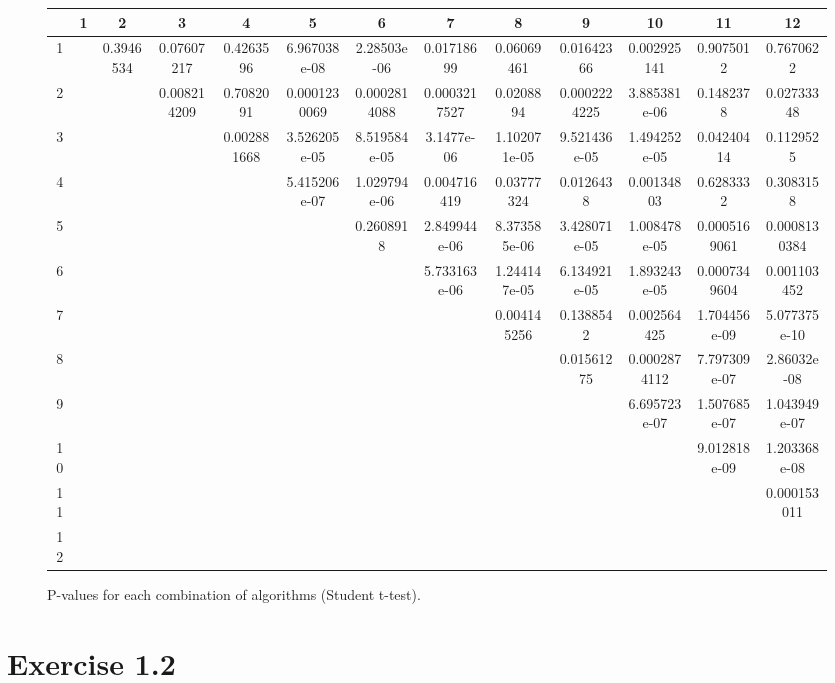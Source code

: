 \begin{landscape}
\begin{figure}
\begin{center}
	\begin{tabular}{|c|c|c|c|c|c|c|c|c|c|c|c|c|} \hline
		& 1 & 2 & 3 & 4 & 5 & 6 & 7 & 8 & 9 & 10 & 11 & 12 \\ \hline \hline
		1 & & 0.3946534 & 0.07607217 & 0.4263596 & 6.967038e-08 & 2.28503e-06 & 0.01718699 & 0.06069461 & 0.01642366 & 0.002925141 & 0.9075012 & 0.7670622 \\ \hline
		2 & & & 0.008214209 & 0.7082091 & 0.0001230069 & 0.0002814088 & 0.0003217527 & 0.0208894 & 0.0002224225 & 3.885381e-06 & 0.1482378 & 0.02733348 \\ \hline
		3 & & & & 0.002881668 & 3.526205e-05 & 8.519584e-05 & 3.1477e-06 & 1.102071e-05 & 9.521436e-05 & 1.494252e-05 & 0.04240414 & 0.1129525 \\ \hline
		4 & & & & & 5.415206e-07 & 1.029794e-06 & 0.004716419 & 0.03777324 & 0.0126438 & 0.00134803 & 0.6283332 & 0.3083158 \\ \hline
		5 & & & & & & 0.2608918 & 2.849944e-06 & 8.373585e-06 & 3.428071e-05 & 1.008478e-05 & 0.0005169061 & 0.0008130384 \\ \hline
		6 & & & & & & & 5.733163e-06 & 1.244147e-05 & 6.134921e-05 & 1.893243e-05 & 0.0007349604 & 0.001103452 \\ \hline
		7 & & & & & & & & 0.004145256 & 0.1388542 & 0.002564425 & 1.704456e-09 & 5.077375e-10 \\ \hline
		8 & & & & & & & & & 0.01561275 & 0.0002874112 & 7.797309e-07 & 2.86032e-08 \\ \hline
		9 & & & & & & & & & & 6.695723e-07 & 1.507685e-07 & 1.043949e-07 \\ \hline
		10 & & & & & & & & & & & 9.012818e-09 & 1.203368e-08 \\ \hline
		11 & & & & & & & & & & & & 0.000153011 \\ \hline
		12 & & & & & & & & & & & & \\ \hline

	
	\end{tabular}
\end{center}
\caption{P-values for each combination of algorithms (Student t-test).}
\end{figure}
\end{landscape}


\section{Exercise 1.2}

